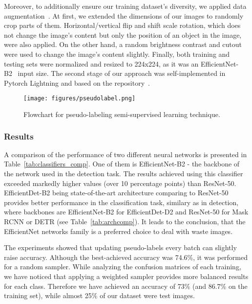 \documentclass{article}
\begin{document}
Moreover, to additionally ensure our training dataset's diversity, we applied data augmentation~\cite{albumentations}. At first, we extended the dimensions of our images to randomly crop parts of them. Horizontal/vertical flip and shift scale rotation, which does not change the image's content but only the position of an object in the image, were also applied. On the other hand, a random brightness contrast and cutout were used to change the image's content slightly. Finally, both training and testing sets were normalized and resized to 224x224, as it was an EfficientNet-B2~\cite{efficientnet2019} input size. The second stage of our approach was self-implemented in Pytorch Lightning and based on the repository~\cite{EfficientNet-git}.

\begin{figure}[!ht]
\centering
  \texttt{[image: figures/pseudolabel.png]}\caption{Flowchart for pseudo-labeling semi-supervised learning technique.\label{fig.pseudolabel}}
\end{figure}

\subsubsection{Results}

A comparison of the performance of two different neural networks is presented in Table~\ref{tab:classifiers_comp}. One of them is EfficientNet-B2 - the backbone of the network used in the detection task. The results achieved using this classifier exceeded markedly higher values (over 10 percentage points) than ResNet-50. EfficientDet-B2 being state-of-the-art architecture comparing to ResNet-50 provides better performance in the classification task, similary as in detection, where backbones are EfficientNet-B2 for EfficientDet-D2 and ResNet-50 for Mask RCNN or DETR (see Table~\ref{tab:archcomp}). It leads to the conclusion, that the EfficientNet networks family is a preferred choice to deal with waste images.

The experiments showed that updating pseudo-labels every batch can slightly raise accuracy. Although the best-achieved accuracy was 74.6\%, it was performed for a random sampler. While analyzing the confusion matrices of each training, we have noticed that applying a weighted sampler provides more balanced results for each class. Therefore we have achieved an accuracy of 73\% (and 86.7\% on the training set), while almost 25\% of our dataset were test images.
\end{document}
